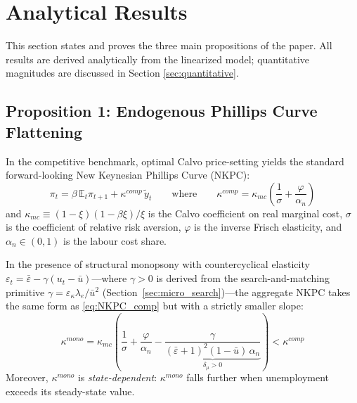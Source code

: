 \section{Analytical Results}
\label{sec:results}

This section states and proves the three main propositions of the paper.
All results are derived analytically from the linearized model; quantitative
magnitudes are discussed in Section \ref{sec:quantitative}.

\subsection{Proposition 1: Endogenous Phillips Curve Flattening}

In the competitive benchmark, optimal Calvo price-setting yields the standard
forward-looking New Keynesian Phillips Curve (NKPC):
\begin{equation}
  \pi_t = \beta\,\mathbb{E}_t\pi_{t+1} + \kappa^{comp}\,\tilde{y}_t
  \qquad \text{where} \qquad
  \kappa^{comp} = \kappa_{mc}\!\left(\frac{1}{\sigma} + \frac{\varphi}{\alpha_n}\right)
  \label{eq:NKPC_comp}
\end{equation}
and $\kappa_{mc} \equiv (1-\xi)(1-\beta\xi)/\xi$ is the Calvo coefficient on
real marginal cost, $\sigma$ is the coefficient of relative risk aversion,
$\varphi$ is the inverse Frisch elasticity, and $\alpha_n \in (0,1)$ is the
labour cost share.

\begin{theorem}
  \label{thm:pc_flattening}
  In the presence of structural monopsony with countercyclical elasticity
  $\varepsilon_t = \bar\varepsilon - \gamma(u_t - \bar u)$---where $\gamma > 0$
  is derived from the search-and-matching primitive
  $\gamma = \varepsilon_\kappa\lambda_e/\bar u^2$
  (Section~\ref{sec:micro_search})---the aggregate NKPC takes the same form
  as \eqref{eq:NKPC_comp} but with a strictly smaller slope:
  \begin{equation}
    \kappa^{mono} = \kappa_{mc}\!\left(\frac{1}{\sigma} + \frac{\varphi}{\alpha_n}
      - \underbrace{\frac{\gamma}{(\bar\varepsilon+1)^2(1-\bar u)\,\alpha_n}}_{\delta_\mu > 0}\right)
    < \kappa^{comp}
    \label{eq:kappa_mono}
  \end{equation}
  Moreover, $\kappa^{mono}$ is \emph{state-dependent}: $\kappa^{mono}$ falls
  further when unemployment exceeds its steady-state value.
\end{theorem}

